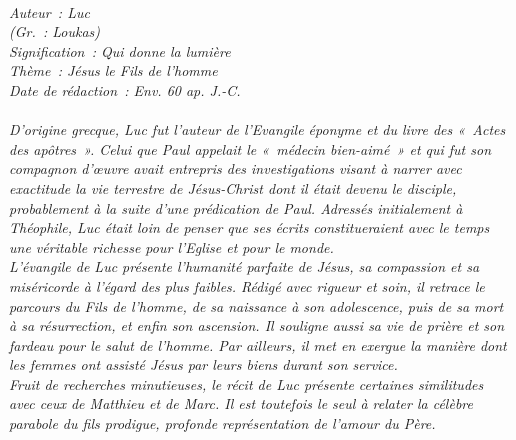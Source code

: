 \BFont
\noindent\hrulefill
{\footnotesize
\textit{
\bigskip
{\centering{}
\\Auteur~: Luc
\\(Gr.~: Loukas)
\\Signification~: Qui donne la lumière
\\Thème~: Jésus le Fils de l'homme
\\Date de rédaction~: Env. 60 ap. J.-C.\\}
}
\textit{
\\D'origine grecque, Luc fut l'auteur de l'Evangile éponyme et du livre des «~Actes des apôtres~». Celui que Paul appelait le «~médecin bien-aimé~» et qui fut son compagnon d'œuvre avait entrepris des investigations visant à narrer avec exactitude la vie terrestre de Jésus-Christ dont il était devenu le disciple, probablement à la suite d'une prédication de Paul. Adressés initialement à Théophile, Luc était loin de penser que ses écrits constitueraient avec le temps une véritable richesse pour l'Eglise et pour le monde.
\\L'évangile de Luc présente l'humanité parfaite de Jésus, sa compassion et sa miséricorde à l'égard des plus faibles. Rédigé avec rigueur et soin, il retrace le parcours du Fils de l'homme, de sa naissance à son adolescence, puis de sa mort à sa résurrection, et enfin son ascension. Il souligne aussi sa vie de prière et son fardeau pour le salut de l'homme. Par ailleurs, il met en exergue la manière dont les femmes ont assisté Jésus par leurs biens durant son service.
\\Fruit de recherches minutieuses, le récit de Luc présente certaines similitudes avec ceux de Matthieu et de Marc. Il est toutefois le seul à relater la célèbre parabole du fils prodigue, profonde représentation de l'amour du Père.\bigskip
}
}
\par\nobreak\noindent\hrulefill
